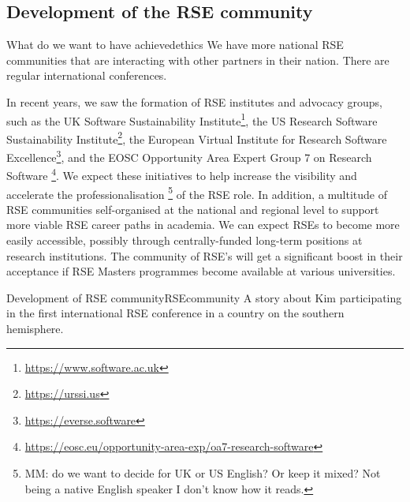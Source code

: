 \documentclass{eceasst}
\begin{document}
\subsection{Development of the RSE community}
\begin{whatis}{What do we want to have achieved}{ethics}
We have more national RSE communities that are interacting with other partners in their nation.
There are regular international conferences.
\end{whatis}
In recent years, we saw the formation of RSE institutes and advocacy groups, such as
the UK Software Sustainability Institute\footnote{\url{https://www.software.ac.uk}},
the US Research Software Sustainability Institute\footnote{\url{https://urssi.us}},
the European Virtual Institute for Research Software Excellence\footnote{\url{https://everse.software}},
and the EOSC Opportunity Area Expert Group 7 on Research Software%
\footnote{\url{https://eosc.eu/opportunity-area-exp/oa7-research-software}}.
We expect these initiatives to help increase the visibility and accelerate
the professionalisation%
\footnote{MM: do we want to decide for UK or US English? Or keep it mixed? Not being a native English speaker I don't know how it reads.}
of the RSE role.
In addition, a multitude of RSE communities self-organised at the national
and regional level to support more viable RSE career paths in academia.
We can expect RSEs to become more easily accessible,
possibly through centrally-funded long-term positions at research institutions.
The community of RSE's will get a significant boost in their acceptance if RSE Masters programmes
become available at various universities.

\begin{story}{Development of RSE community}{RSEcommunity}
A story about Kim participating in the first international RSE conference in a country on the southern hemisphere.
\end{story}
\end{document}
